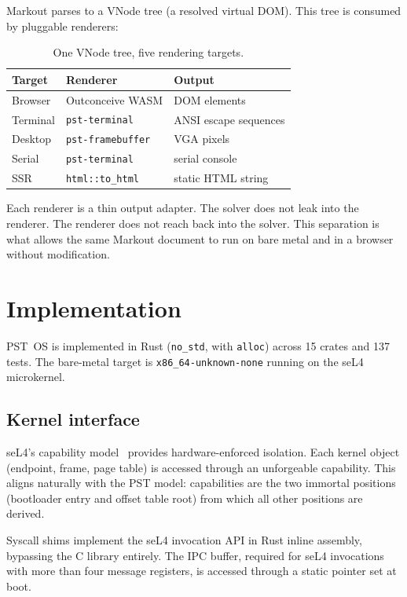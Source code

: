 \documentclass[11pt,a4paper]{article}
\begin{document}
Markout parses to a VNode tree (a resolved virtual DOM). This tree is consumed by pluggable renderers:

\begin{table}[h]
\centering
\begin{tabular}{lll}
\toprule
\textbf{Target} & \textbf{Renderer} & \textbf{Output} \\
\midrule
Browser  & Outconceive WASM   & DOM elements \\
Terminal & \texttt{pst-terminal} & ANSI escape sequences \\
Desktop  & \texttt{pst-framebuffer} & VGA pixels \\
Serial   & \texttt{pst-terminal}    & serial console \\
SSR      & \texttt{html::to\_html}  & static HTML string \\
\bottomrule
\end{tabular}
\caption{One VNode tree, five rendering targets.}
\label{tab:renderers}
\end{table}

Each renderer is a thin output adapter. The solver does not leak into the renderer. The renderer does not reach back into the solver. This separation is what allows the same Markout document to run on bare metal and in a browser without modification.

\section{Implementation}
\label{sec:impl}

PST~OS is implemented in Rust (\texttt{no\_std}, with \texttt{alloc}) across 15 crates and 137 tests. The bare-metal target is \texttt{x86\_64-unknown-none} running on the seL4 microkernel.

\subsection{Kernel interface}

seL4's capability model~\citep{sel4, capability} provides hardware-enforced isolation. Each kernel object (endpoint, frame, page table) is accessed through an unforgeable capability. This aligns naturally with the PST model: capabilities are the two immortal positions (bootloader entry and offset table root) from which all other positions are derived.

Syscall shims implement the seL4 invocation API in Rust inline assembly, bypassing the C library entirely. The IPC buffer, required for seL4 invocations with more than four message registers, is accessed through a static pointer set at boot.
\end{document}
